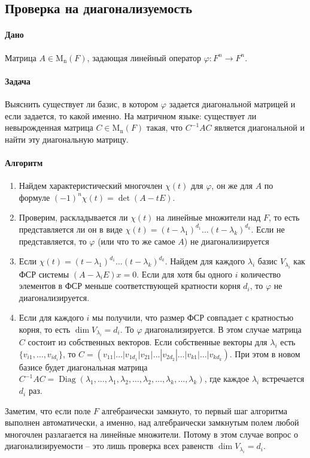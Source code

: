 \documentclass{article}
\newcommand{\Matrix}[2]{\operatorname{\mathrm{M}_{#2}}(#1)}
\begin{document}
\subsection{Проверка на диагонализуемость}

\paragraph{Дано} Матрица $A\in\Matrix{F}{n}$, задающая линейный оператор $\varphi\colon F^n\to F^n$.

\paragraph{Задача} Выяснить существует ли базис, в котором $\varphi$ задается диагональной матрицей и если задается, то какой именно. На матричном языке: существует ли невырожденная матрица $C\in \Matrix{F}{n}$ такая, что $C^{-1}AC$ является диагональной и найти эту диагональную матрицу.

\paragraph{Алгоритм}

\begin{enumerate}
\item Найдем характеристический многочлен $\chi(t)$ для $\varphi$, он же для $A$ по формуле $(-1)^n\chi(t) = \det(A-t E)$.

\item Проверим, раскладывается ли $\chi(t)$ на линейные множители над $F$, то есть представляется ли он в виде $\chi(t) = (t-\lambda_1)^{d_1} \ldots (t-\lambda_k)^{d_k}$. Если не представляется, то $\varphi$ (или что то же самое $A$) не диагонализируется


\item Если $\chi(t) = (t-\lambda_1)^{d_1} \ldots (t-\lambda_k)^{d_k}$. Найдем для каждого $\lambda_i$ базис $V_{\lambda_i}$ как ФСР системы $(A-\lambda_i E)x = 0$. Если для хотя бы одного $i$ количество элементов в ФСР меньше соответствующей кратности корня $d_i$, то $\varphi$ не диагонализируется.

\item Если для каждого $i$ мы получили, что размер ФСР совпадает с кратностью корня, то есть $\dim V_{\lambda_i} = d_i$. То $\varphi$ диагонализируется. В этом случае матрица $C$ состоит из собственных векторов. Если собственные векторы для $\lambda_i$ есть $\{v_{i1},\ldots,v_{id_i}\}$, то $C = (v_{11}|\ldots|v_{1d_1}|v_{21}|\ldots|v_{2d_2}|\ldots |v_{k1}|\ldots|v_{kd_k})$. При этом в новом базисе будет диагональная матрица $C^{-1}AC =\operatorname{Diag}(\lambda_1,\ldots,\lambda_1,\lambda_2,\ldots,\lambda_2,\ldots,\lambda_k,\ldots,\lambda_k)$, где каждое $\lambda_i$ встречается $d_i$ раз.
\end{enumerate}


Заметим, что если поле $F$ алгебраически замкнуто, то первый шаг алгоритма выполнен автоматически, а именно, над алгебраически замкнутым полем любой многочлен разлагается на линейные множители. Потому в этом случае вопрос о диагонализируемости -- это лишь проверка всех равенств $\dim V_{\lambda_i} = d_i$.
\end{document}
